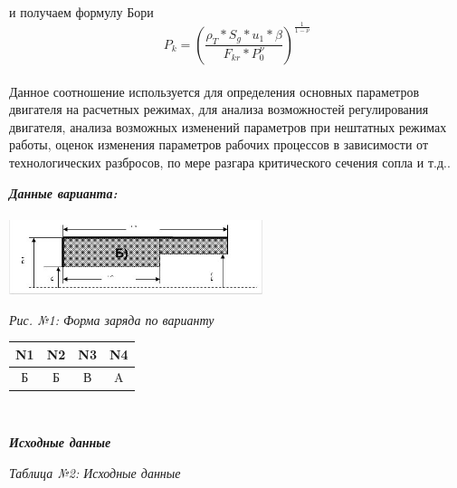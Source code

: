 и получаем формулу Бори
\begin{equation}\label{eq:fourierrow} 
P_k = {(\frac{\rho_T * S_g * u_1 * \beta}{F_{kr} * P_0^\nu})}^{\frac{1}{1 - \nu}}
\end{equation}\\
Данное соотношение используется для определения основных параметров двигателя на расчетных режимах, для анализа возможностей регулирования двигателя, анализа возможных изменений параметров при нештатных режимах работы, оценок изменения параметров рабочих процессов в зависимости от технологических разбросов, по мере разгара критического сечения сопла и т.д..\\
\begin{center}
\textbf{\textit{Данные варианта:}}\\
~\\
\includegraphics[width=7.4cm]{1} \\
\end{center}
\begin{flushright}
{\textit{Рис. №1: Форма заряда по варианту}}\\
\end{flushright}
\begin{center}
\begin{tabular}{  | c | c | c | c | }
\hline
N1 & N2 & N3 & N4 \\
\hline
Б & Б & В & A \\
\hline
\end{tabular}
\end{center}
~\\

\begin{center}
\textbf{\textit{Исходные данные}}\\
\end{center}
\begin{flushright}
\textit{Таблица №2: Исходные данные}\\
\end{flushright}
~\\
